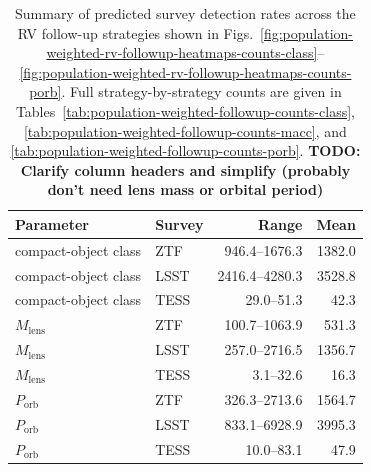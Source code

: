 \begin{table}
    \centering
    \caption{Summary of predicted survey detection rates across the RV follow-up strategies shown in Figs.~\ref{fig:population-weighted-rv-followup-heatmaps-counts-class}--\ref{fig:population-weighted-rv-followup-heatmaps-counts-porb}. Full strategy-by-strategy counts are given in Tables~\ref{tab:population-weighted-followup-counts-class}, \ref{tab:population-weighted-followup-counts-macc}, and \ref{tab:population-weighted-followup-counts-porb}. \textbf{TODO: Clarify column headers and simplify (probably don't need lens mass or orbital period)}}
    \label{tab:population-weighted-followup-counts-summary}
    \begin{tabular}{llrr}
        \hline
        Parameter & Survey & Range & Mean \\
        \hline
        compact-object class & ZTF & 946.4--1676.3 & 1382.0 \\
        compact-object class & LSST & 2416.4--4280.3 & 3528.8 \\
        compact-object class & TESS & 29.0--51.3 & 42.3 \\
        $M_\mathrm{lens}$ & ZTF & 100.7--1063.9 & 531.3 \\
        $M_\mathrm{lens}$ & LSST & 257.0--2716.5 & 1356.7 \\
        $M_\mathrm{lens}$ & TESS & 3.1--32.6 & 16.3 \\
        $P_\mathrm{orb}$ & ZTF & 326.3--2713.6 & 1564.7 \\
        $P_\mathrm{orb}$ & LSST & 833.1--6928.9 & 3995.3 \\
        $P_\mathrm{orb}$ & TESS & 10.0--83.1 & 47.9 \\
        \hline
    \end{tabular}
\end{table}
